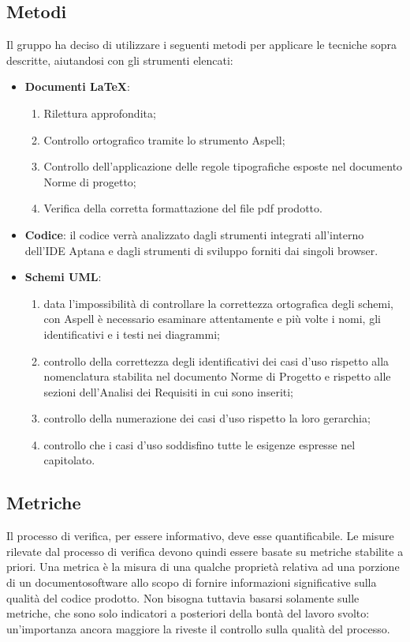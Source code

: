 \subsection{Metodi}
\label{sec:Metodi}
Il gruppo ha deciso di utilizzare i seguenti metodi per applicare le tecniche sopra descritte, aiutandosi con gli strumenti elencati:
\begin{itemize}
\item \textbf{Documenti \LaTeX}:
\begin{enumerate}
\item Rilettura approfondita;
\item Controllo ortografico tramite lo strumento Aspell;
\item Controllo dell'applicazione delle regole tipografiche esposte nel documento Norme di progetto;
\item Verifica della corretta formattazione del file pdf prodotto.
\end{enumerate}

\item \textbf{Codice}: il codice verrà analizzato dagli strumenti integrati all'interno dell'IDE Aptana e dagli strumenti di sviluppo forniti dai singoli browser.

\item \textbf{Schemi UML}:
\begin{enumerate}
	\item data l'impossibilità di controllare la correttezza ortografica degli schemi, con Aspell è necessario esaminare attentamente e più volte i nomi, gli identificativi e i testi nei diagrammi;
	\item controllo della correttezza degli identificativi dei casi d'uso rispetto alla nomenclatura stabilita nel documento Norme di Progetto e rispetto alle sezioni dell'Analisi dei Requisiti in cui sono inseriti;
	\item controllo della numerazione dei casi d'uso rispetto la loro gerarchia;
	\item controllo che i casi d'uso soddisfino tutte le esigenze espresse nel capitolato.
\end{enumerate}
\end{itemize}
\subsection{Metriche}
Il processo di verifica, per essere informativo, deve esse quantificabile. Le misure rilevate dal processo di verifica devono quindi essere basate su metriche stabilite a priori.
Una metrica è la misura di una qualche proprietà relativa ad una porzione di un documentosoftware allo scopo di fornire informazioni significative sulla qualità del codice prodotto.
Non bisogna tuttavia basarsi solamente sulle metriche, che sono solo indicatori a posteriori della bontà del lavoro svolto: un'importanza ancora maggiore la riveste il controllo sulla qualità del processo.
